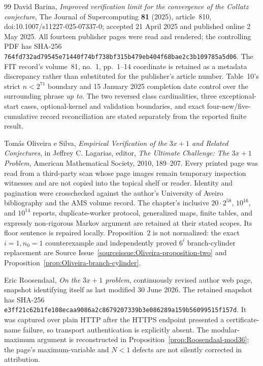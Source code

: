 \begin{thebibliography}{99}
David Barina,
\emph{Improved verification limit for the convergence of the Collatz
conjecture},
The Journal of Supercomputing \textbf{81} (2025), article~810,
doi:10.1007/s11227-025-07337-0; accepted 21 April 2025 and published online
2 May 2025.  All fourteen publisher pages were read and rendered; the
controlling PDF has SHA-256
\nolinkurl{764fd732ad79545e71440f74bf738bf315b479eb404f68bae2c3b109785a5d06}.
The FIT record's volume~81, no.~1, pp.~1--14 coordinate is retained as a
metadata discrepancy rather than substituted for the publisher's article
number.  Table~10's strict $n<2^{71}$ boundary and 15 January 2025 completion
date control over the surrounding phrase \emph{up to}.  The two reversed
class cardinalities, three exceptional-start cases, optional-kernel and
validation boundaries, and exact four-new/five-cumulative record
reconciliation are stated separately from the reported finite result.

Tomás Oliveira e Silva,
\emph{Empirical Verification of the $3x+1$ and Related Conjectures},
in Jeffrey C. Lagarias, editor,
\emph{The Ultimate Challenge: The $3x+1$ Problem},
American Mathematical Society, 2010, 189--207.
Every printed page was read from a third-party scan whose page images remain
temporary inspection witnesses and are not copied into the topical shelf or
reader.  Identity and pagination were crosschecked against the author's
University of Aveiro bibliography and the AMS volume record.  The chapter's
inclusive $20\cdot2^{58}$, $10^{16}$, and $10^{14}$ reports, duplicate-worker
protocol, generalized maps, finite tables, and expressly non-rigorous Markov
argument are retained at their stated scopes.  Its floor sentence is repaired
locally.  Proposition~2 is not normalized: the exact $i=1,n_0=1$
counterexample and independently proved $6^i$ branch-cylinder replacement
are Source Issue~\ref{sourceissue:Oliveira-proposition-two} and
Proposition~\ref{prop:Oliveira-branch-cylinder}.

Eric Roosendaal,
\emph{On the $3x+1$ problem},
continuously revised author web page, snapshot identifying itself as last
modified 30 June 2026.  The retained snapshot has SHA-256
\nolinkurl{e3ff21c62b1fe108ecaa9086a2c8679207339b3e086289a159b56099515f157d}.
It was captured over plain HTTP after the HTTPS endpoint presented a
certificate-name failure, so transport authentication is explicitly absent.
The modular-maximum argument is reconstructed in
Proposition~\ref{prop:Roosendaal-mod36}; the page's maximum-variable and
$N<1$ defects are not silently corrected in attribution.


\end{thebibliography}
